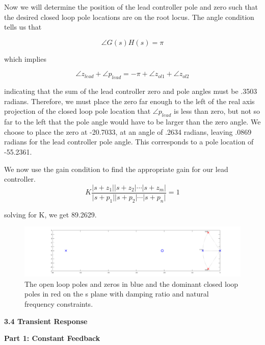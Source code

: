 \documentclass[11pt,a4paper]{article}
\begin{document}
Now we will determine the position of the lead controller pole and zero such that the desired closed loop pole locations are on the root locus. The angle condition tells us that

\begin{equation}
	\angle G(s)H(s) = \pi
\end{equation}

which implies

\begin{equation}
	\angle z_{lead} + \angle p_{lead} = - \pi + \angle z_{ol1} + \angle z_{ol2}
\end{equation}

indicating that the sum of the lead controller zero and pole angles must be .3503 radians. Therefore, we must place the zero far enough to the left of the real axis projection of the closed loop pole location that $\angle p_{lead}$ is less than zero, but not so far to the left that the pole angle would have to be larger than the zero angle. We choose to place the zero at -20.7033, at an angle of .2634 radians, leaving .0869 radians for the lead controller pole angle. This corresponds to a pole location of -55.2361.

We now use the gain condition to find the appropriate gain for our lead controller. 
\begin{equation}
	K \frac{\lvert s + z_{1} \rvert \lvert s + z_{2} \rvert \cdots \lvert s + z_{m} \rvert }{\lvert s + p_{1} \rvert \lvert s + p_{2} \rvert \cdots \lvert s + p_{n} \rvert} = 1
\end{equation}
 
 solving for K,  we get 89.2629. 
 
 
\begin{figure}[h!]
	\includegraphics[width=\textwidth]{imglab/lab4sol_leadpoles.png}
	\caption{The open loop poles and zeros in blue and the dominant closed loop poles in red on the s plane with damping ratio and natural frequency constraints.}
\end{figure}


\textbf{3.4 Transient Response}

\textbf{Part 1: Constant Feedback}
\end{document}
